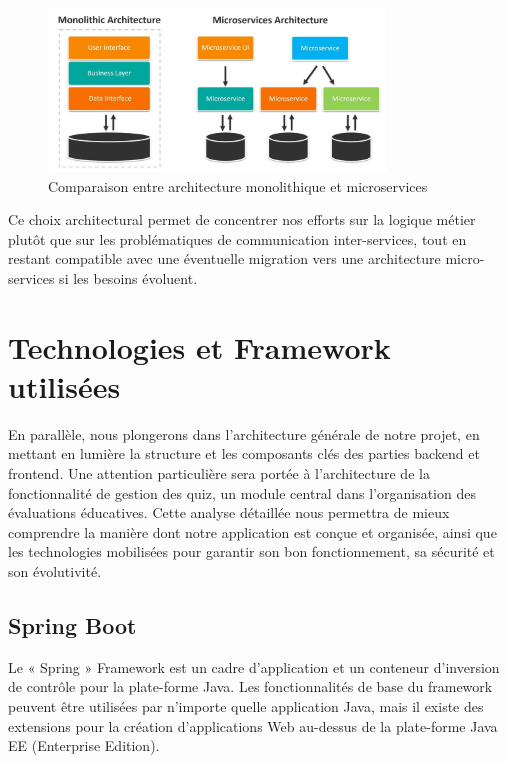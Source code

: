 \documentclass[12pt,a4paper]{report}
\begin{document}
\begin{figure}[H]
\centering
\includegraphics[width=0.8\textwidth]{latex_media/media/image15.jpeg}
\caption{Comparaison entre architecture monolithique et microservices}
\label{fig:comparaison-architectures-tech}
\end{figure}

Ce choix architectural permet de concentrer nos efforts sur la logique métier plutôt que sur les problématiques de communication inter-services, tout en restant compatible avec une éventuelle migration vers une architecture micro-services si les besoins évoluent.

\section{Technologies et Framework utilisées}

En parallèle, nous plongerons dans l'architecture générale de notre projet, en mettant en lumière la structure et les composants clés des parties backend et frontend. Une attention particulière sera portée à l'architecture de la fonctionnalité de gestion des quiz, un module central dans l'organisation des évaluations éducatives. Cette analyse détaillée nous permettra de mieux comprendre la manière dont notre application est conçue et organisée, ainsi que les technologies mobilisées pour garantir son bon fonctionnement, sa sécurité et son évolutivité.

\subsection{Spring Boot}

Le « Spring » Framework est un cadre d'application et un conteneur d'inversion de contrôle pour la plate-forme Java. Les fonctionnalités de base du framework peuvent être utilisées par n'importe quelle application Java, mais il existe des extensions pour la création d'applications Web au-dessus de la plate-forme Java EE (Enterprise Edition).
\end{document}
